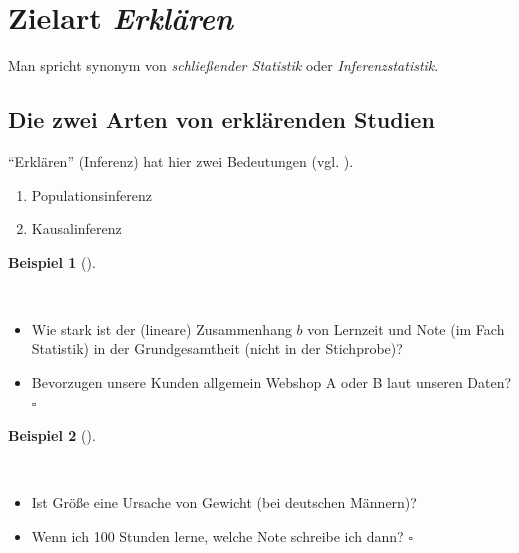\documentclass[
  ngerman,
  letterpaper,
  twoside,
  open=any]{scrbook}
\providecommand{\tightlist}{%
  \setlength{\itemsep}{0pt}\setlength{\parskip}{0pt}}\usepackage{longtable,booktabs,array}
\theoremstyle{definition}
\newtheorem{example}{Beispiel}[chapter]
\theoremstyle{plain}
\theoremstyle{definition}
\theoremstyle{definition}
\theoremstyle{definition}
\newtheorem{example}{Beispiel}[chapter]
\theoremstyle{definition}
\theoremstyle{remark}
\begin{document}
\section{\texorpdfstring{Zielart
\emph{Erklären}}{Zielart Erklären}}\label{zielart-erkluxe4ren}

Man spricht synonym von \emph{schließender Statistik} oder
\emph{Inferenzstatistik}.

\subsection{Die zwei Arten von erklärenden
Studien}\label{die-zwei-arten-von-erkluxe4renden-studien}

\enquote{Erklären} (Inferenz) hat hier zwei Bedeutungen (vgl.
).

\begin{enumerate}
\def\labelenumi{\arabic{enumi}.}
\tightlist
\item
  Populationsinferenz
\item
  Kausalinferenz
\end{enumerate}

\begin{example}[]\protect\hypertarget{exm-popinferenz}{}\label{exm-popinferenz}

~

\begin{itemize}
\tightlist
\item
  Wie stark ist der (lineare) Zusammenhang \(b\) von Lernzeit und Note
  (im Fach Statistik) in der Grundgesamtheit (nicht in der Stichprobe)?
\item
  Bevorzugen unsere Kunden allgemein Webshop A oder B laut unseren
  Daten? \(\square\)
\end{itemize}

\end{example}

\begin{example}[]\protect\hypertarget{exm-kausal}{}\label{exm-kausal}

~

\begin{itemize}
\tightlist
\item
  Ist Größe eine Ursache von Gewicht (bei deutschen Männern)?
\item
  Wenn ich 100 Stunden lerne, welche Note schreibe ich dann? \(\square\)
\end{itemize}

\end{example}
\end{document}
